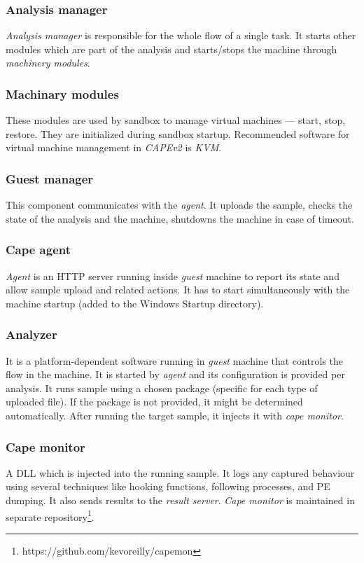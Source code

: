 \subsubsection*{Analysis manager}
\emph{Analysis manager} is responsible for the whole flow of a single task. It starts other modules which are part of the analysis and starts/stops the machine through \emph{machinery modules}.

\subsubsection*{Machinary modules}
These modules are used by sandbox to manage virtual machines --- start, stop, restore. They are initialized during sandbox startup. Recommended  software for virtual machine management in \emph{CAPEv2} is \emph{KVM}.

\subsubsection*{Guest manager}
This component communicates with the \emph{agent}. It uploads the sample, checks the state of the analysis and the machine, shutdowns the machine in case of timeout.

\subsubsection*{Cape agent}
\emph{Agent} is an HTTP server running inside \emph{guest} machine to report its state and allow sample upload and related actions. It has to start simultaneously with the machine startup (added to the Windows Startup directory).

\subsubsection*{Analyzer}
It is a platform-dependent software running in \emph{guest} machine that controls the flow in the machine. It is started by \emph{agent} and its configuration is provided per analysis. It runs sample using a chosen package (specific for each type of uploaded file). If the package is not provided, it might be determined automatically. After running the target sample, it injects it with \emph{cape monitor}.

\subsubsection*{Cape monitor}
A DLL which is injected into the running sample. It logs any captured behaviour using several techniques like hooking functions, following processes, and PE dumping. It also sends results to the \emph{result server}. \emph{Cape monitor} is maintained in separate repository\footnote{https://github.com/kevoreilly/capemon}.

